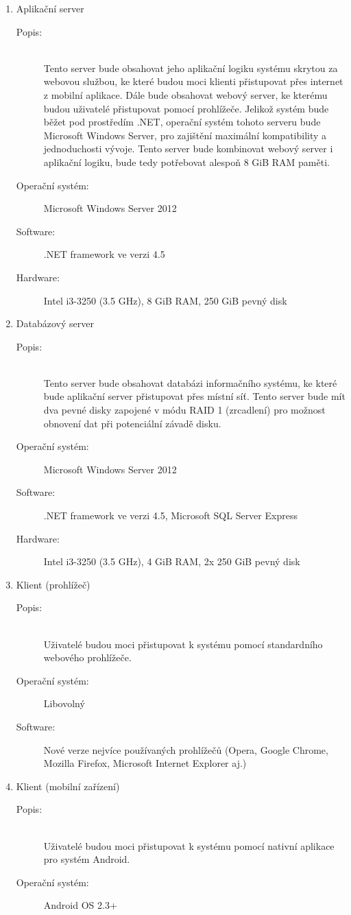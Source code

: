 \documentclass[a4paper,10pt,titlepage]{article}
\begin{document}
		\begin{enumerate}
			\item Aplikační server
				\begin{description}
					\item[Popis:] \hfill \\Tento server bude obsahovat jeho aplikační logiku systému skrytou za webovou službou, ke které budou moci klienti přistupovat přes
						internet z mobilní aplikace. Dále bude obsahovat webový server, ke kterému budou uživatelé přistupovat pomocí prohlížeče.
						Jelikož systém bude běžet pod prostředím .NET, operační systém tohoto serveru bude Microsoft Windows Server, pro zajištění maximální kompatibility
						a jednoduchosti vývoje. Tento server bude kombinovat webový server i aplikační logiku, bude tedy potřebovat alespoň 8 GiB RAM paměti.
					\item[Operační systém:] Microsoft Windows Server 2012
					\item[Software:] .NET framework ve verzi 4.5
					\item[Hardware:] Intel i3-3250 (3.5 GHz), 8 GiB RAM, 250 GiB pevný disk
				\end{description}
			\item Databázový server
			\begin{description}
				\item[Popis:] \hfill \\Tento server bude obsahovat databázi informačního systému, ke které bude aplikační server přistupovat přes místní síť.
						Tento server  bude mít dva pevné disky zapojené v módu RAID 1 (zrcadlení) pro možnost obnovení
						dat při potenciální závadě disku.
				\item[Operační systém:] Microsoft Windows Server 2012
				\item[Software:] .NET framework ve verzi 4.5, Microsoft SQL Server Express
				\item[Hardware:] Intel i3-3250 (3.5 GHz), 4 GiB RAM, 2x 250 GiB pevný disk
			\end{description}
		\item Klient (prohlížeč)
			\begin{description}
				\item[Popis:] \hfill \\Uživatelé budou moci přistupovat k systému pomocí standardního webového prohlížeče.
				\item[Operační systém:] Libovolný
				\item[Software:] Nové verze nejvíce používaných prohlížečů (Opera, Google Chrome, Mozilla Firefox, Microsoft Internet Explorer aj.)
			\end{description}
		\item Klient (mobilní zařízení)
			\begin{description}
				\item[Popis:] \hfill \\Uživatelé budou moci přistupovat k systému pomocí nativní aplikace pro systém Android.
				\item[Operační systém:] Android OS 2.3+
			\end{description}
		\end{enumerate}
\end{document}
